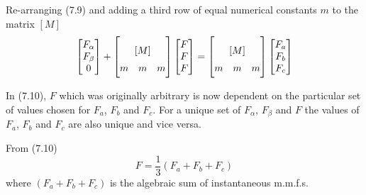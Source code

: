 \documentclass[a4paper,numbers=noenddot,12pt]{scrbook}
\begin{document}
    Re-arranging (7.9) and adding a third row of equal numerical constants $m$ to the matrix $[M]$
    \begin{equation}
        \begin{bmatrix}
            F_{\alpha} \\ F_{\beta} \\ 0
        \end{bmatrix}
        +
        \begin{bmatrix}
            [M] \vphantom
            {\begin{matrix}
                F \\ F
            \end{matrix}} \\
            \begin{matrix}
                m & m & m
            \end{matrix}
        \end{bmatrix}
        \begin{bmatrix}
            F \\ F \\ F
        \end{bmatrix}
        =
        \begin{bmatrix}
            [M] \vphantom
            {\begin{matrix}
                F \\ F
            \end{matrix}} \\
            \begin{matrix}
                m & m & m
            \end{matrix}
        \end{bmatrix}
        \begin{bmatrix}
            F_a \\ F_b \\ F_c
        \end{bmatrix}
        \label{eq:Eq7.10}
    \end{equation}

    In (7.10), $F$ which was originally arbitrary is now dependent on the particular set of values chosen for $F_a$, $F_b$ and $F_c$. For a unique set of $F_{\alpha}$, $F_{\beta}$ and $F$ the values of $F_a$, $F_b$ and $F_c$ are also unique and vice versa.

    From (7.10)
    \begin{equation}
        F = \dfrac{1}{3}(F_a + F_b + F_c)
        \label{eq:Eq7.11}
    \end{equation}
    where $(F_a + F_b + F_c)$ is the algebraic sum of instantaneous m.m.f.s.
\end{document}
